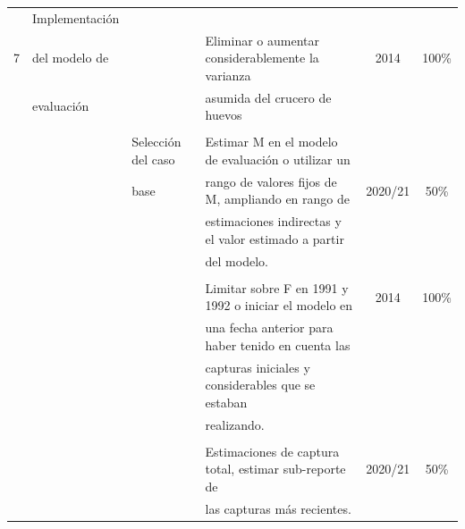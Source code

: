 \documentclass[
  spanish,
]{article}
\begin{document}
\begin{table}[h]
{\begin{tabular}{|c|l|l|l|c|c|}
     & Implementación&                      &                                                        &       & \\
   7 & del modelo de &                      & Eliminar o aumentar considerablemente la varianza      & 2014  & 100\% \\
     & evaluación    &                      & asumida del crucero de huevos                          &       & \\
     &               &                      &                                                        &       & \\
     &               & Selección del caso   & Estimar M en el modelo de evaluación o utilizar un     &       & \\
     &               & base                 & rango de valores fijos de M, ampliando en rango de     & 2020/21 & 50\% \\
     &               &                      & estimaciones indirectas y el valor estimado a partir   &       & \\
     &               &                      & del modelo.                                            &       & \\
     &               &                      &                                                        &       & \\
     &               &                      & Limitar sobre F en 1991 y 1992 o iniciar el modelo en  &  2014  & 100\% \\
     &               &                      & una fecha anterior para haber tenido en cuenta las     &       & \\
     &               &                      & capturas iniciales y considerables que se estaban      &       & \\
     &               &                      & realizando.                                            &       & \\
     &               &                      &                                                        &       & \\
     &               &                      & Estimaciones de captura total, estimar sub-reporte de  &2020/21 & 50\% \\
     &               &                      & las capturas más recientes.                            &       & \\ \hline
 \end{tabular}}
    \end{table}
\end{document}

